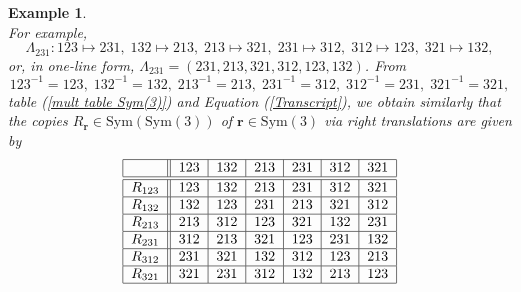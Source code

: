 \documentclass{article}
\newtheorem{example}[theorem]{Example}
\begin{document}
\begin{example}
\begin{equation}
\label{Sym(Sym(3))F}
\end{equation}%
For example, 
\begin{equation*}
\Lambda _{231}:123\mapsto 231,\;132\mapsto 213,\;213\mapsto 321,\;231\mapsto
312,\;312\mapsto 123,\;321\mapsto 132,
\end{equation*}%
or, in one-line form, $\Lambda _{231}=(231,213,321,312,123,132)$. From 
\begin{equation*}
123^{-1}=123,\;132^{-1}=132,\;213^{-1}=213,\;231^{-1}=312,\;312^{-1}=231,\;321^{-1}=321,
\end{equation*}%
table (\ref{mult table Sym(3)}) and  Equation (\ref{Transcript}), we obtain
similarly that the copies $R_{\mathbf{r}}\in \mathrm{Sym}(\mathrm{Sym}(3))$
of $\mathbf{r}\in \mathrm{Sym}(3)$ via right translations are given by \vspace{12pt}
\begin{equation}
\begin{tabular}{|c||l|l|l|l|l|l|}
\hline
& $123$ & $132$ & $213$ & $231$ & $312$ & $321$ \\ \hline\hline
$R_{123}$ & $123$ & $132$ & $213$ & $231$ & $312$ & $321$ \\ \hline
$R_{132}$ & $132$ & $123$ & $231$ & $213$ & $321$ & $312$ \\ \hline
$R_{213}$ & $213$ & $312$ & $123$ & $321$ & $132$ & $231$ \\ \hline
$R_{231}$ & $312$ & $213$ & $321$ & $123$ & $231$ & $132$ \\ \hline
$R_{312}$ & $231$ & $321$ & $132$ & $312$ & $123$ & $213$ \\ \hline
$R_{321}$ & $321$ & $231$ & $312$ & $132$ & $213$ & $123$ \\ \hline
\end{tabular}
\label{Sym(Sym(3))T}
\end{equation}
\end{example}
\end{document}
